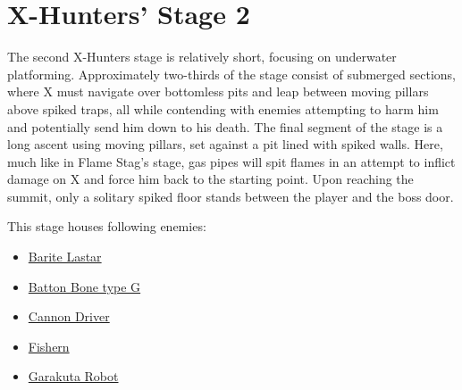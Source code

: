\section{X-Hunters' Stage 2}

The second X-Hunters stage is relatively short, focusing on underwater platforming. Approximately two-thirds of the stage consist of submerged sections, where X must navigate over bottomless pits and leap between moving pillars above spiked traps, all while contending with enemies attempting to harm him and potentially send him down to his death. The final segment of the stage is a long ascent using moving pillars, set against a pit lined with spiked walls. Here, much like in Flame Stag's stage, gas pipes will spit flames in an attempt to inflict damage on X and force him back to the starting point. Upon reaching the summit, only a solitary spiked floor stands between the player and the boss door.

This stage houses following enemies:
\begin{itemize}
	\item \hyperlink{enem:Barite_Lastar}{Barite Lastar}
	\item \hyperlink{enem:Batton_Bone_type_G}{Batton Bone type G}
	\item \hyperlink{enem:Cannon_Driver}{Cannon Driver}
	\item \hyperlink{enem:Fishern}{Fishern}
	\item \hyperlink{enem:Garakuta_Robot}{Garakuta Robot}
\end{itemize}

